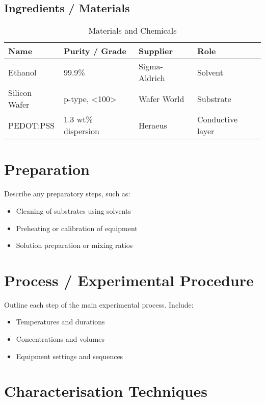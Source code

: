 \documentclass[12pt,a4paper]{article}
\begin{document}
\subsection{Ingredients / Materials}
\begin{table}[H]
    \centering
    \caption{Materials and Chemicals}
    \begin{tabular}{@{}llll@{}}
        \toprule
        \textbf{Name} & \textbf{Purity / Grade}          & \textbf{Supplier} & \textbf{Role}    \\
        \midrule
        Ethanol       & 99.9\%                           & Sigma-Aldrich     & Solvent          \\
        Silicon Wafer & p-type, \textless100\textgreater & Wafer World       & Substrate        \\
        PEDOT:PSS     & 1.3 wt\% dispersion              & Heraeus           & Conductive layer \\
        \bottomrule
    \end{tabular}
\end{table}

\section{Preparation}
Describe any preparatory steps, such as:
\begin{itemize}
    \item Cleaning of substrates using solvents
    \item Preheating or calibration of equipment
    \item Solution preparation or mixing ratios
\end{itemize}

\section{Process / Experimental Procedure}
Outline each step of the main experimental process. Include:
\begin{itemize}
    \item Temperatures and durations
    \item Concentrations and volumes
    \item Equipment settings and sequences
\end{itemize}

\section{Characterisation Techniques}
\end{document}
